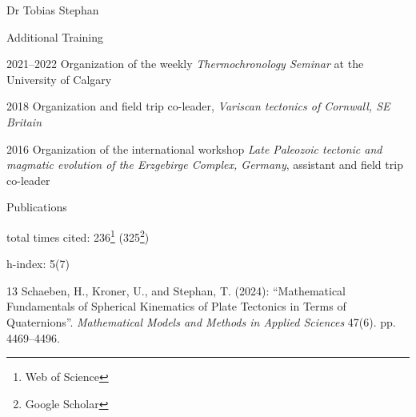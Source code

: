 \documentclass[10pt, paper=letter]{scrartcl} %
\begin{document}
\begin{cv}{Dr Tobias Stephan}
\begin{cvlist}{Additional Training}
\item[2021--2022] Organization of the weekly \textit{Thermochronology Seminar} at the University of Calgary
    \item[2018] Organization and field trip co-leader, \textit{Variscan tectonics of Cornwall, SE Britain}
    \item[2016] Organization of the international workshop \textit{Late Paleozoic tectonic and magmatic evolution of the Erzgebirge Complex, Germany}, assistant and field trip co-leader
\end{cvlist}

\begin{cvlist}{Publications}
\item[total times cited:] 236\footnote[1]{Web of Science} (325\footnote[2]{Google Scholar})
\item[h-index:] 5\footnotemark[1] (7\footnotemark[2])
    \item[13] Schaeben, H., Kroner, U., and Stephan, T. (2024): \enquote{Mathematical Fundamentals of Spherical Kinematics of Plate Tectonics in Terms of Quaternions}. \textit{Mathematical Models and Methods in Applied Sciences} 47(6). pp. 4469--4496. 


\end{cvlist}
\end{cv}
\end{document}
